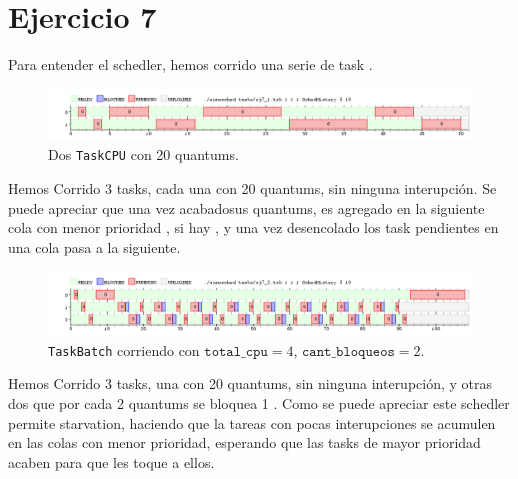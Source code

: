 \section{Ejercicio 7}
Para entender el schedler, hemos corrido  una serie de task .

\begin{figure}[ht]
	\begin{center}
		\includegraphics[width=1\columnwidth]{imagenes/ej7_1.png}
		\caption{Dos \texttt{TaskCPU} con 20 quantums.}
	\end{center}
\end{figure}

Hemos Corrido 3 tasks, cada una con 20 quantums, sin ninguna interupción. Se puede apreciar que una vez acabadosus quantums, es agregado en la siguiente cola con menor prioridad , si hay , y una vez desencolado los task pendientes en una cola pasa a la siguiente.


\begin{figure}[ht]
	\begin{center}
		\includegraphics[width=1\columnwidth]{imagenes/ej7_2.png}
		\caption{\texttt{TaskBatch} corriendo con $\texttt{total\_cpu} = 4$,
		$\texttt{cant\_bloqueos} = 2$.}
	\end{center}
\end{figure}

Hemos Corrido 3 tasks, una con 20 quantums, sin ninguna interupción, y otras dos que por cada 2 quantums se bloquea 1 . Como se puede apreciar este schedler permite starvation, haciendo que la tareas con pocas interupciones se acumulen en las colas con menor prioridad, esperando que las tasks de mayor prioridad acaben para que les toque a ellos.

